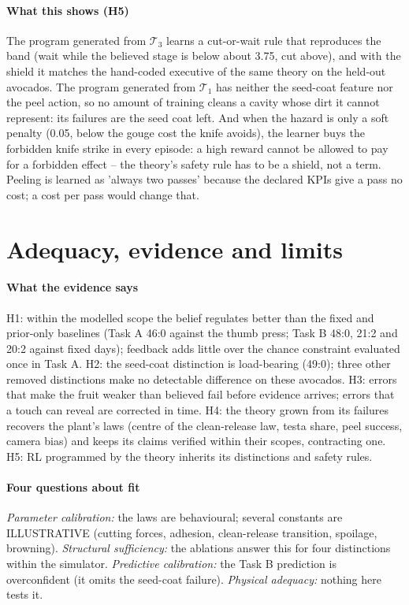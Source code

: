\documentclass[10.5pt,a4paper]{article}
\begin{document}
\paragraph{What this shows (H5)} The program generated from $\mathcal{T}_3$ learns a cut-or-wait rule that
reproduces the band (wait while the believed stage is below about 3.75, cut above), and with the shield it matches
the hand-coded executive of the same theory on the held-out avocados. The program generated from $\mathcal{T}_1$ has
neither the seed-coat feature nor the peel action, so no amount of training cleans a cavity whose dirt it cannot
represent: its failures are the seed coat left. And when the hazard is only a soft penalty (0.05, below the gouge
cost the knife avoids), the learner buys the forbidden knife strike in every episode: a high reward cannot be allowed
to pay for a forbidden effect -- the theory's safety rule has to be a shield, not a term. Peeling is learned as 'always
two passes' because the declared KPIs give a pass no cost; a cost per pass would change that.
\section{Adequacy, evidence and limits}
\paragraph{What the evidence says} H1: within the modelled scope the belief regulates better than the fixed and
prior-only baselines (Task A 46:0 against the thumb press; Task B 48:0, 21:2 and 20:2 against fixed days); feedback adds
little over the chance constraint evaluated once in Task A. H2: the seed-coat distinction is load-bearing (49:0); three
other removed distinctions make no detectable difference on these avocados. H3: errors that make the fruit weaker than
believed fail before evidence arrives; errors that a touch can reveal are corrected in time. H4: the theory grown from
its failures recovers the plant's laws (centre of the clean-release law, testa share, peel success, camera bias) and
keeps its claims verified within their scopes, contracting one. H5: RL programmed by the theory inherits its
distinctions and safety rules.

\paragraph{Four questions about fit} \emph{Parameter calibration:} the laws are behavioural; several constants are
ILLUSTRATIVE (cutting forces, adhesion, clean-release transition, spoilage, browning). \emph{Structural sufficiency:}
the ablations answer this for four distinctions within the simulator. \emph{Predictive calibration:} the Task B
prediction is overconfident (it omits the seed-coat failure). \emph{Physical adequacy:} nothing here tests it.
\end{document}
